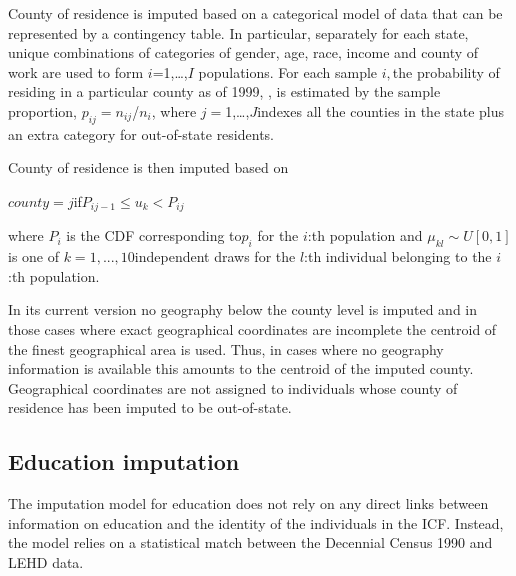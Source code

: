 County of residence is imputed based on a categorical model of data that can be represented by a contingency table. In particular, separately for each state, unique combinations of categories of gender, age, race, income and county of work are used to form $i$=1,\ldots ,$I$ populations. For each sample $i, $the probability of residing in a particular county as of 1999, 
, is estimated by the sample proportion, $p_{ij}=n_{ij}$/$n_{i}$, where $j=$1,\ldots ,$J $indexes all the counties in the state plus an extra category for out-of-state residents. 





County of residence is then imputed based on

$county = j$if$P_{ij - 1} \le u_k < P_{ij} $



\noindent
where $P_i $ is the CDF corresponding to$p_i $ for the $i$:th population and $\mu _{kl} \sim U[0,1]$ is one of $k = 1,...,10$independent draws for the $l$:th individual belonging to the $i$:th population. 





In its current version no geography below the county level is imputed and in those cases where exact geographical coordinates are incomplete the centroid of the finest geographical area is used. Thus, in cases where no geography information is available this amounts to the centroid of the imputed county. Geographical coordinates are not assigned to individuals whose county of residence has been imputed to be out-of-state. 





\subsection{Education imputation}





The imputation model for education does not rely on any direct links between information on education and the identity of the individuals in the ICF. Instead, the model relies on a statistical match between the Decennial Census 1990 and LEHD data. 





